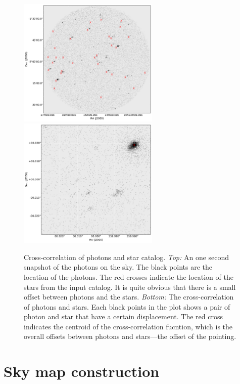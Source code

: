 \documentclass[12pt, preprint]{aastex}
\begin{document}
\begin{figure}[p]
\begin{center}
\includegraphics[width=0.6\textwidth]{figures/slice.pdf}
\includegraphics[width=0.6\textwidth]{figures/corr.pdf}
\end{center}
\caption{%
  \label{slice}
  Cross-correlation of photons and star catalog.
  \emph{Top:}  An one second snapshot of the photons on the sky. The black points are the location of the photons. The red crosses indicate the location of the stars from the input catalog. It is quite obvious that there is a small offset between photons and the stars.
  \emph{Bottom:} The cross-correlation of photons and stars. Each black points in the plot shows a pair of photon and star that have a certain displacement. The red cross indicates the centroid of the cross-correlation fucntion, which is the overall offsets between photons and stars---the offset of the pointing.
  }
\end{figure}


\section{Sky map construction}
\end{document}
